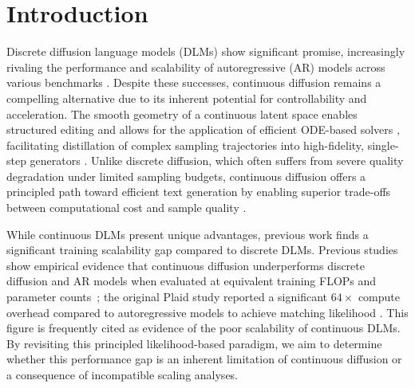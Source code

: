 \documentclass{article}
\begin{document}
%

%

%

%

%



\section{Introduction}
\label{sec:intro}

%

%
%
%
%
%


%

%


%

%

%

%

%


%

Discrete diffusion language models (DLMs) show significant promise, increasingly rivaling the performance and scalability of autoregressive (AR) models across various benchmarks \citep{khanna2025mercury,song2025seed}. Despite these successes, continuous diffusion remains a compelling alternative due to its inherent potential for controllability and acceleration. The smooth geometry of a continuous latent space enables structured editing \citep{meng2022sdedit,chung2023diffusion}
%
and allows for the application of efficient ODE-based solvers \citep{zhang2023fast,lu2022dpmsolver}, facilitating distillation of complex sampling trajectories into high-fidelity, single-step generators \citep{salimans2022progressive,song2023consistency}. Unlike discrete diffusion, which often suffers from severe quality degradation under limited sampling budgets, continuous diffusion offers a principled path toward efficient text generation by enabling superior trade-offs between computational cost and sample quality \citep{kingma2021variational, karras2022elucidating}.


%




While continuous DLMs present unique advantages, previous work finds a significant training scalability gap compared to discrete DLMs. Previous studies show empirical evidence that continuous diffusion underperforms discrete diffusion and AR models when evaluated at equivalent training FLOPs and parameter counts~\cite{austin2021structured, gulrajani2023plaid}; the original Plaid study reported a significant $64\times$ compute overhead compared to autoregressive models to achieve matching likelihood \cite{gulrajani2023plaid}. This figure is frequently cited as evidence of the poor scalability of continuous DLMs. By revisiting this principled likelihood-based paradigm, we aim to determine whether this performance gap is an inherent limitation of continuous diffusion or a consequence of incompatible scaling analyses.
\end{document}
